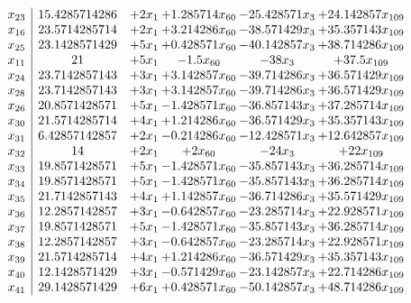\documentclass[11pt]{article}
\begin{document}
\[\begin{array}{c| c c@{\hskip 2pt} c@{\hskip 2pt} c@{\hskip 2pt} c@{\hskip 2pt} }
 x_{23}   &  15.4285714286 & + 2 x_{1} & + 1.285714 x_{60} & -25.428571 x_{3} & + 24.142857 x_{109}\\
 x_{16}   &  23.5714285714 & + 2 x_{1} & + 3.214286 x_{60} & -38.571429 x_{3} & + 35.357143 x_{109}\\
 x_{25}   &  23.1428571429 & + 5 x_{1} & + 0.428571 x_{60} & -40.142857 x_{3} & + 38.714286 x_{109}\\
 x_{11}   &  21 & + 5 x_{1} & -1.5 x_{60} & -38 x_{3} & + 37.5 x_{109}\\
 x_{24}   &  23.7142857143 & + 3 x_{1} & + 3.142857 x_{60} & -39.714286 x_{3} & + 36.571429 x_{109}\\
 x_{28}   &  23.7142857143 & + 3 x_{1} & + 3.142857 x_{60} & -39.714286 x_{3} & + 36.571429 x_{109}\\
 x_{26}   &  20.8571428571 & + 5 x_{1} & -1.428571 x_{60} & -36.857143 x_{3} & + 37.285714 x_{109}\\
 x_{30}   &  21.5714285714 & + 4 x_{1} & + 1.214286 x_{60} & -36.571429 x_{3} & + 35.357143 x_{109}\\
 x_{31}   &  6.42857142857 & + 2 x_{1} & -0.214286 x_{60} & -12.428571 x_{3} & + 12.642857 x_{109}\\
 x_{32}   &  14 & + 2 x_{1} & + 2 x_{60} & -24 x_{3} & + 22 x_{109}\\
 x_{33}   &  19.8571428571 & + 5 x_{1} & -1.428571 x_{60} & -35.857143 x_{3} & + 36.285714 x_{109}\\
 x_{34}   &  19.8571428571 & + 5 x_{1} & -1.428571 x_{60} & -35.857143 x_{3} & + 36.285714 x_{109}\\
 x_{35}   &  21.7142857143 & + 4 x_{1} & + 1.142857 x_{60} & -36.714286 x_{3} & + 35.571429 x_{109}\\
 x_{36}   &  12.2857142857 & + 3 x_{1} & -0.642857 x_{60} & -23.285714 x_{3} & + 22.928571 x_{109}\\
 x_{37}   &  19.8571428571 & + 5 x_{1} & -1.428571 x_{60} & -35.857143 x_{3} & + 36.285714 x_{109}\\
 x_{38}   &  12.2857142857 & + 3 x_{1} & -0.642857 x_{60} & -23.285714 x_{3} & + 22.928571 x_{109}\\
 x_{39}   &  21.5714285714 & + 4 x_{1} & + 1.214286 x_{60} & -36.571429 x_{3} & + 35.357143 x_{109}\\
 x_{40}   &  12.1428571429 & + 3 x_{1} & -0.571429 x_{60} & -23.142857 x_{3} & + 22.714286 x_{109}\\
 x_{41}   &  29.1428571429 & + 6 x_{1} & + 0.428571 x_{60} & -50.142857 x_{3} & + 48.714286 x_{109}\\

\end{array}\]
\end{document}
